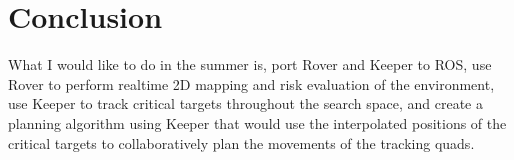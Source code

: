 \documentclass[12pt]{article}
\begin{document}
\section{Conclusion}

What I would like to do in the summer is, port Rover and Keeper to ROS, use
Rover to perform realtime 2D mapping and risk evaluation of the environment,
use Keeper to track critical targets throughout the search space, and create a
planning algorithm using Keeper that would use the interpolated positions of
the critical targets to collaboratively plan the movements of the tracking
quads.
\end{document}
